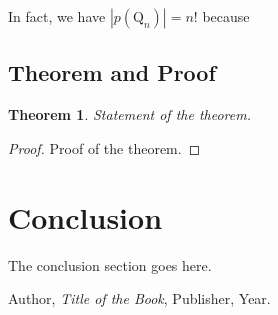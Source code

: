 \documentclass[12pt]{article}
\newtheorem{theorem}{Theorem}[section]
\theoremstyle{definition}
\theoremstyle{remark}
\newcommand{\Qn}{\text{Q}_n}
\begin{document}
In fact, we have $|p(\Qn)| = n!$ because 

\subsection{Theorem and Proof}
\begin{theorem}
Statement of the theorem.
\end{theorem}

\begin{proof}
Proof of the theorem.
\end{proof}

\section{Conclusion}
The conclusion section goes here.

\begin{thebibliography}{9}
 Author, \textit{Title of the Book}, Publisher, Year.
\end{thebibliography}
\end{document}
